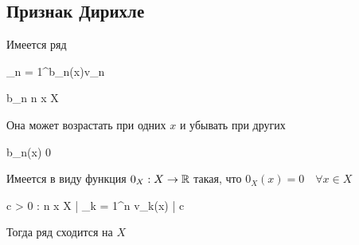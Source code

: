 \subsection{Признак Дирихле}

\begin{theorem}
	Имеется ряд
	\begin{equ}{19}
		\sum_{n = 1}^\infty b_n(x)v_n
	\end{equ}
	\begin{equ}{20}
		b_n  n \quad \forall {} x \in X
	\end{equ}
	\begin{note}
		Она может возрастать при одних $ x $ и убывать при других
	\end{note}
	\begin{equ}{21}
		b_n(x)  0
	\end{equ}
	\begin{note}
		Имеется в виду функция $ 0_X : X \to \mathbb{R} $ такая, что $ 0_X(x) = 0 \quad \forall x \in X $
	\end{note}
	\begin{equ}{22}
		\exist c > 0 : \quad \forall n \quad \forall x \in X \quad \bigg| \sum_{k = 1}^n v_k(x) \bigg| \le c
	\end{equ}
	Тогда ряд   сходится на $ X $
\end{theorem}

